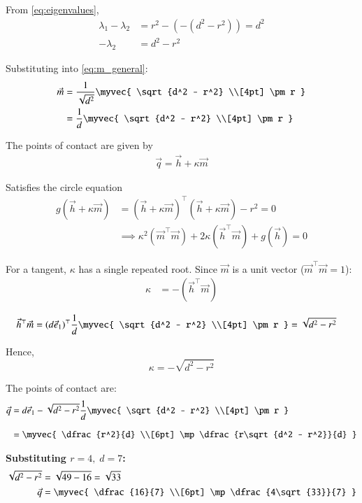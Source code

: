\documentclass[journal]{article}
\begin{document}
From \eqref{eq:eigenvalues},
\begin{align}
\lambda_1 - \lambda_2 &= r^2 - (-(d^2 - r^2)) = d^2 \\
-\lambda_2 &= d^2 - r^2
\end{align}

Substituting into \eqref{eq:m_general}:
\begin{align}
\vec{m} 
&= \frac{1}{\sqrt{d^2}} 
\myvec{
\sqrt{d^2 - r^2} \\[4pt]
\pm r
}
\\
&= \frac{1}{d}
\myvec{
\sqrt{d^2 - r^2} \\[4pt]
\pm r
}
\label{eq:m_final}
\end{align}

The points of contact are given by 
\begin{align}
\vec{q} = \vec{h} + \kappa \vec{m}
\end{align}

Satisfies the circle equation
\begin{align}
g(\vec{h} + \kappa\vec{m}) 
&= (\vec{h} + \kappa\vec{m})^\top (\vec{h} + \kappa\vec{m}) - r^2 = 0 \\
&\implies 
\kappa^2 (\vec{m}^\top \vec{m}) + 2\kappa(\vec{h}^\top \vec{m}) + g(\vec{h}) = 0
\end{align}

For a tangent, \(\kappa\) has a single repeated root.
Since \(\vec{m}\) is a unit vector (\(\vec{m}^\top \vec{m} = 1\)):
\begin{align}
\kappa &= -(\vec{h}^\top \vec{m}) \label{eq:kappa_def}
\end{align}

\begin{align}
\vec{h}^\top \vec{m} 
&= (d\vec{e}_1)^\top 
\frac{1}{d}
\myvec{
\sqrt{d^2 - r^2} \\[4pt]
\pm r
}
= \sqrt{d^2 - r^2} 
\end{align}

Hence,
\[
\kappa = -\sqrt{d^2 - r^2}
\]

The points of contact are:
\begin{align}
\vec{q} 
&= d\vec{e}_1 - \sqrt{d^2 - r^2}
\frac{1}{d}
\myvec{
\sqrt{d^2 - r^2} \\[4pt]
\pm r
}
\\[6pt]
&=
\myvec{
\dfrac{r^2}{d} \\[6pt]
\mp \dfrac{r\sqrt{d^2 - r^2}}{d}
}
\label{eq:points}
\end{align}

\textbf{Substituting \(r = 4, \; d = 7\):}
\begin{align}
\sqrt{d^2 - r^2} &= \sqrt{49 - 16} = \sqrt{33} \\
\vec{q} 
&=
\myvec{
\dfrac{16}{7} \\[6pt]
\mp \dfrac{4\sqrt{33}}{7}
}
\end{align}
\end{document}
